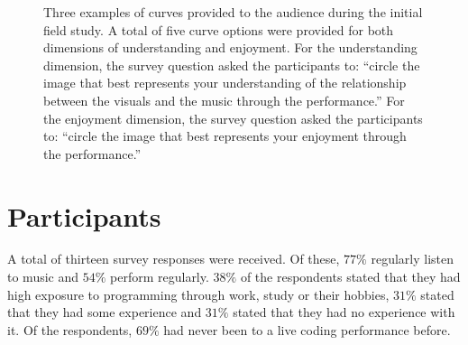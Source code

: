 \begin{figure}
\centering
{}
\hfill
{}
\hfill
{}
\caption[Exploratory field study survey dimension curves]{Three examples of curves provided to the audience during the
initial field study. A total of five curve options were provided for
both dimensions of understanding and enjoyment. For the understanding
dimension, the survey question asked the participants to: ``circle the
image that best represents your understanding of the relationship
between the visuals and the music through the performance.'' For the
enjoyment dimension, the survey question asked the participants to:
``circle the image that best represents your enjoyment through the
performance.''}
\label{fig:understanding-over-time}
\end{figure}


\section{Participants}

A total of thirteen survey responses were received. Of these, $77\%$ regularly listen to music and $54\%$ perform regularly. $38\%$ of the respondents stated that they had high exposure to programming through work, study or their hobbies, $31\%$ stated that they had some experience and $31\%$ stated that they had no experience with it. Of the respondents, $69\%$ had never been to a live coding performance before.

